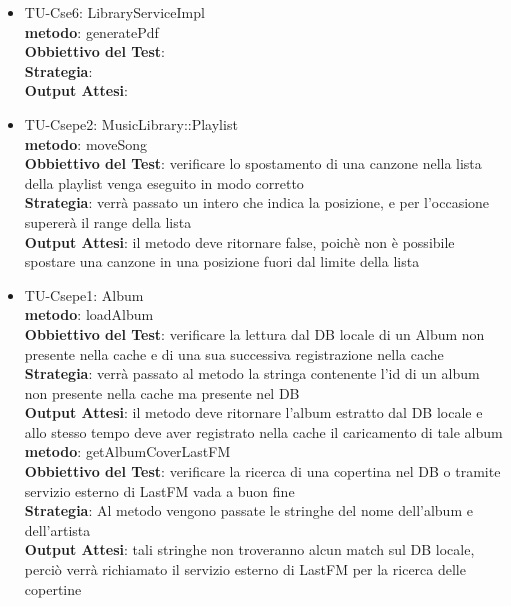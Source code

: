 \begin{itemize}
\item TU-Cse6: LibraryServiceImpl\\
\textbf{metodo}: generatePdf\\
\textbf{Obbiettivo del Test}: \\
\textbf{Strategia}:\\
\textbf{Output Attesi}: \\

\item TU-Csepe2: MusicLibrary::Playlist\\
\textbf{metodo}: moveSong\\
\textbf{Obbiettivo del Test}: verificare lo spostamento di una canzone nella
lista della playlist venga eseguito in modo corretto\\
\textbf{Strategia}: verr\`a passato un intero che indica la posizione, e per
l'occasione superer\`a il range della lista\\
\textbf{Output Attesi}: il metodo deve ritornare false, poich\`e non \`e
possibile spostare una canzone in una posizione fuori dal limite della lista\\

\item TU-Csepe1: Album\\
\textbf{metodo}: loadAlbum\\
\textbf{Obbiettivo del Test}: verificare la lettura dal DB locale di un Album
non presente nella cache e di una sua successiva registrazione nella cache\\
\textbf{Strategia}: verr\`a passato al metodo la stringa contenente l'id di un
album non presente nella cache ma presente nel DB\\
\textbf{Output Attesi}: il metodo deve ritornare l'album estratto dal DB
locale e allo stesso tempo deve aver registrato nella cache il caricamento di
tale album\\


\textbf{metodo}: getAlbumCoverLastFM\\
\textbf{Obbiettivo del Test}: verificare la ricerca di una copertina nel DB o
tramite servizio esterno di LastFM vada a buon fine\\
\textbf{Strategia}:
Al metodo vengono passate le stringhe del nome dell'album e dell'artista \\
\textbf{Output Attesi}: tali stringhe non troveranno alcun match sul DB
locale, perci\`o verr\`a richiamato il servizio esterno di LastFM per la
ricerca delle copertine\\




\end{itemize}
